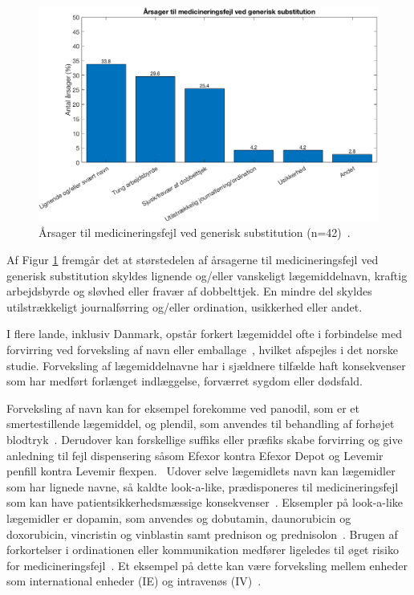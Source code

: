 \begin{figure}[H]\centering	\includegraphics[width=1\textwidth]{billeder/GenSub1.png} 
	\caption{Årsager til medicineringsfejl ved generisk substitution (n=42)~\citep{Hakonsen2010}.}	\label{fig:GeneriskSubstitution1}  
\end{figure}

Af Figur \ref{fig:GeneriskSubstitution1} fremgår det at størstedelen af årsagerne til medicineringsfejl ved generisk substitution skyldes lignende og/eller vanskeligt lægemiddelnavn, kraftig arbejdsbyrde og sløvhed eller fravær af dobbelttjek. En mindre del skyldes utilstrækkeligt journalførring og/eller ordination, usikkerhed eller andet. 

I flere lande, inklusiv Danmark, opstår forkert lægemiddel ofte i forbindelse med forvirring ved forveksling af navn eller emballage~\citep{DanskSelskabforPatientsikkerhed2009}, hvilket afspejles i det norske studie. Forveksling af lægemiddelnavne har i sjældnere tilfælde haft konsekvenser som har medført forlænget indlæggelse, forværret sygdom eller dødsfald.~\citep{DanskSelskabforPatientsikkerhed2009}

Forveksling af navn kan for eksempel forekomme ved panodil, som er et smertestillende lægemiddel, og plendil, som anvendes til behandling af forhøjet blodtryk~\citep{DanskSelskabforPatientsikkerhed2009}. Derudover kan forskellige suffiks eller præfiks skabe forvirring og give anledning til fejl dispensering såsom Efexor kontra Efexor Depot og Levemir penfill kontra Levemir flexpen.~\citep{DanskSelskabforPatientsikkerhed2009} Udover selve lægemidlets navn kan lægemidler som har lignede navne, så kaldte look-a-like, prædisponeres til medicineringsfejl som kan have patientsikkerhedsmæssige konsekvenser~\citep{Wittich2014}. Eksempler på look-a-like lægemidler er  dopamin, som anvendes  og dobutamin, daunorubicin og doxorubicin, vincristin og vinblastin samt prednison og prednisolon~\citep{Wittich2014}. Brugen af forkortelser i ordinationen eller kommunikation medfører ligeledes til øget risiko for medicineringsfejl~\citep{Wittich2014}. Et eksempel på dette kan være  forveksling mellem enheder som international enheder (IE) og intravenøs (IV)~\citep{Wittich2014}. 

